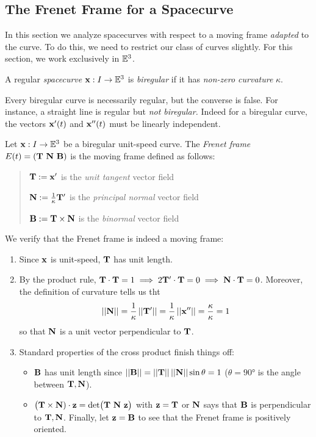 \clearpage



\subsection{The Frenet Frame for a Spacecurve}\label{sec:frenet}

In this section we analyze spacecurves with respect to a moving frame \emph{adapted} to the curve. To do this, we need to restrict our class of curves slightly. For this section, we work exclusively in $\mathbb{E}^3$.


\begin{defn}{}{}
	A regular \emph{spacecurve} ${\mathbf{x}}:I\to\mathbb{E}^3$ is \emph{biregular} if it has \emph{non-zero curvature} $\kappa$.
\end{defn}

Every biregular curve is necessarily regular, but the converse is false. For instance, a straight line is regular but \emph{not biregular.} Indeed for a biregular curve, the vectors ${\mathbf{x}}'(t)$ and ${\mathbf{x}}''(t)$ must be linearly independent.

\begin{defn}{}{}
	Let ${\mathbf{x}}:I\to\mathbb{E}^3$ be a biregular unit-speed curve. The \emph{Frenet frame} $E(t)=({\mathbf{T}}\ {\mathbf{N}}\ {\mathbf{B}})$ is the moving frame defined as follows:
	\begin{quote}
		${\mathbf{T}}:={\mathbf{x}}'$ is the \emph{unit tangent} vector field\par
		${\mathbf{N}}:=\frac 1{\kappa}{\mathbf{T}}'$ is the \emph{principal normal} vector field\par
		${\mathbf{B}}:={\mathbf{T}}\times{\mathbf{N}}$ is the \emph{binormal} vector field
	\end{quote}
\end{defn}

We verify that the Frenet frame is indeed a moving frame:
\begin{enumerate}
  \item Since ${\mathbf{x}}$ is unit-speed, ${\mathbf{T}}$ has unit length.
  \item By the product rule, ${\mathbf{T}}\cdot{\mathbf{T}}=1\implies 2{\mathbf{T}}'\cdot{\mathbf{T}}=0\implies {\mathbf{N}}\cdot{\mathbf{T}}=0$. Moreover, the definition of curvature tells us tht
  \[\left| \left| {\mathbf{N}}\right|\right|=\frac 1\kappa\left| \left| {\mathbf{T}}'\right|\right|=\frac 1\kappa\left| \left| {\mathbf{x}}''\right|\right|=\frac\kappa\kappa=1\]
  so that ${\mathbf{N}}$ is a unit vector perpendicular to ${\mathbf{T}}$.
  \item Standard properties of the cross product finish things off:
  \begin{itemize}
    \item ${\mathbf{B}}$ has unit length since $\left| \left| {\mathbf{B}}\right|\right|=\left| \left| {\mathbf{T}}\right|\right|\left| \left| {\mathbf{N}}\right|\right|\sin\theta =1$ ($\theta=\ang{90}$ is the angle between ${\mathbf{T}},{\mathbf{N}}$).
    \item $\bigl(\vT\times\vN)\cdot\vz=\det\bigl(\vT\ \vN\ \vz\bigr)$ with ${\mathbf{z}}={\mathbf{T}}$ or ${\mathbf{N}}$ says that ${\mathbf{B}}$ is perpendicular to ${\mathbf{T}},{\mathbf{N}}$. Finally, let ${\mathbf{z}}={\mathbf{B}}$ to see that the Frenet frame is positively oriented.
  \end{itemize}
\end{enumerate}


